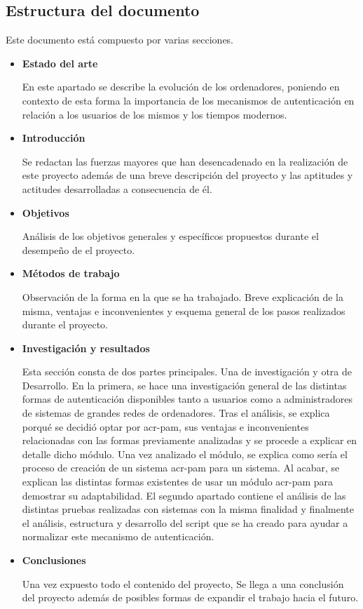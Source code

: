 \documentclass[titlepage, 12pt, a4paper]{article}
\begin{document}
\subsection{Estructura del documento}
Este documento está compuesto por varias secciones.
\begin{itemize}
	\item{\textbf{Estado del arte}}\par
		En este apartado se describe la evolución de los ordenadores, poniendo en contexto de esta forma la importancia de los mecanismos de autenticación en relación a los usuarios de los mismos y los tiempos modernos.
	\item{\textbf{Introducción}}\par
		Se redactan las fuerzas mayores que han desencadenado en la realización de este proyecto además de una breve descripción del proyecto y las aptitudes y actitudes desarrolladas a consecuencia de él.
	\item{\textbf{Objetivos}}\par
		Análisis de los objetivos generales y específicos propuestos durante el desempeño de el proyecto.
	\item{\textbf{Métodos de trabajo}}\par
		Observación de la forma en la que se ha trabajado. Breve explicación de la misma, ventajas e inconvenientes y esquema general de los pasos realizados durante el proyecto.
	\item{\textbf{Investigación y resultados}}\par
		Esta sección consta de dos partes principales. Una de investigación y otra de Desarrollo. En la primera, se hace una investigación general de las distintas formas de autenticación disponibles tanto a usuarios como a administradores de sistemas de grandes redes de ordenadores. Tras el análisis, se explica porqué se decidió optar por \gls{acr-pam}, sus ventajas e inconvenientes relacionadas con las formas previamente analizadas y se procede a explicar en detalle dicho módulo. Una vez analizado el módulo, se explica como sería el proceso de creación de un sistema \gls{acr-pam} para un sistema. Al acabar, se explican las distintas formas existentes de usar un módulo \gls{acr-pam} para demostrar su adaptabilidad. El segundo apartado contiene el análisis de las distintas pruebas realizadas con sistemas con la misma finalidad y finalmente el análisis, estructura y desarrollo del \gls{script} que se ha creado para ayudar a normalizar este mecanismo de autenticación.
	\item{\textbf{Conclusiones}}\par
		Una vez expuesto todo el contenido del proyecto, Se llega a una conclusión del proyecto además de posibles formas de expandir el trabajo hacia el futuro.
\end{itemize}
\clearpage
\end{document}
